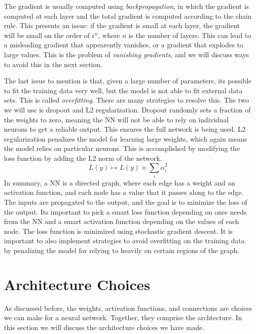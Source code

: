 The gradient is usually computed using \textit{backpropagation}, in which the gradient is computed at each layer and the total gradient is computed according to the chain rule. This presents an issue: if the gradient is small at each layer, the gradient will be small on the order of $\epsilon^{n}$, where $n$ is the number of layers. This can lead to a misleading gradient that appearently vanishes, or a gradient that explodes to large values. This is the problem of \textit{vanishing gradients}, and we will discuss ways to avoid this in the next section.

The last issue to mention is that, given a large number of parameters, its possible to fit the training data very well, but the model is not able to fit external data sets. This is called \textit{overfitting}. There are many strategies to resolve this. The two we will use is dropout and L2 regularization. Dropout randomly sets a fraction of the weights to zero, meaning the NN will not be able to rely on individual neurons to get a reliable output. This ensures the full network is being used. L2 regularization penalizes the model for learning large weights, which again means the model relies on particular neurons. This is accomplished by modifying the loss function by adding the L2 norm of the network.
\begin{equation}
	L(y) \mapsto L(y)+\sum_i \alpha_i^2
\end{equation}
In summary, a NN is a directed graph, where each edge has a weight and an activation function, and each node has a value that it passes along to the edge. The inputs are propagated to the output, and the goal is to minimize the loss of the output. Its important to pick a smart loss function depending on ones needs from the NN and a smart activation function depending on the values of each node. The loss function is minimized using stochastic gradient descent. It is important to also implement strategies to avoid overfitting on the training data by penalizing the model for relying to heavily on certain regions of the graph.
\section{Architecture Choices}
As discussed before, the weights, activation functions, and connections are choices we can make for a neural network. Together, they comprise the archtecture. In this section we will discuss the architecture choices we have made.

